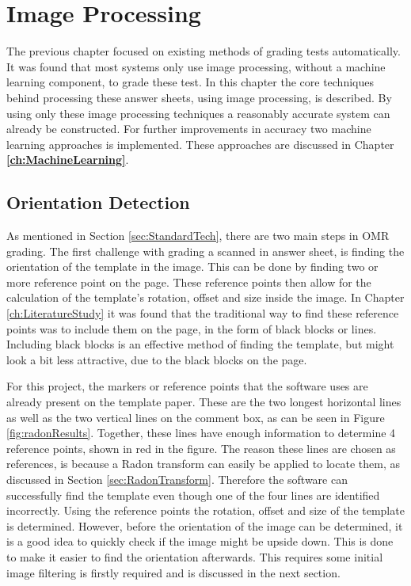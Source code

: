 \chapter{Image Processing}
\label{ch:ImageProcessing}
\graphicspath{{Chapter3/Chapter3Figures/}}
The previous chapter focused on existing methods of grading tests automatically. It was found that most systems only use image processing, without a machine learning component, to grade these test. In this chapter the core techniques behind processing these answer sheets, using image processing, is described. By using only these image processing techniques a reasonably accurate system can already be constructed. For further improvements in accuracy two machine learning approaches is implemented. These approaches are discussed in Chapter \textbf{\ref{ch:MachineLearning}}.

\section{Orientation Detection}
\label{sec:orientDetect}
As mentioned in Section \ref{sec:StandardTech}, there are two main steps in OMR grading. The first challenge with grading a scanned in answer sheet, is finding the orientation of the template in the image. This can be done by finding two or more reference point on the page. These reference points then allow for the calculation of the template's rotation, offset and size inside the image. In Chapter \ref{ch:LiteratureStudy} it was found that the traditional way to find these reference points was to include them on the page, in the form of black blocks or lines. Including black blocks is an effective method of finding the template, but might look a bit less attractive, due to the black blocks on the page.

For this project, the markers or reference points that the software uses are already present on the template paper. These are the two longest horizontal lines as well as the two vertical lines on the comment box, as can be seen in Figure \ref{fig:radonResults}. Together, these lines have enough information to determine 4 reference points, shown in red in the figure. The reason these lines are chosen as references, is because a Radon transform can easily be applied to locate them, as discussed in Section \ref{sec:RadonTransform}. Therefore the software can successfully find the template even though one of the four lines are identified incorrectly. Using the reference points the rotation, offset and size of the template is determined. However, before the orientation of the image can be determined, it is a good idea to quickly check if the image might be upside down. This is done to make it easier to find the orientation afterwards. This requires some initial image filtering is firstly required and is discussed in the next section.

